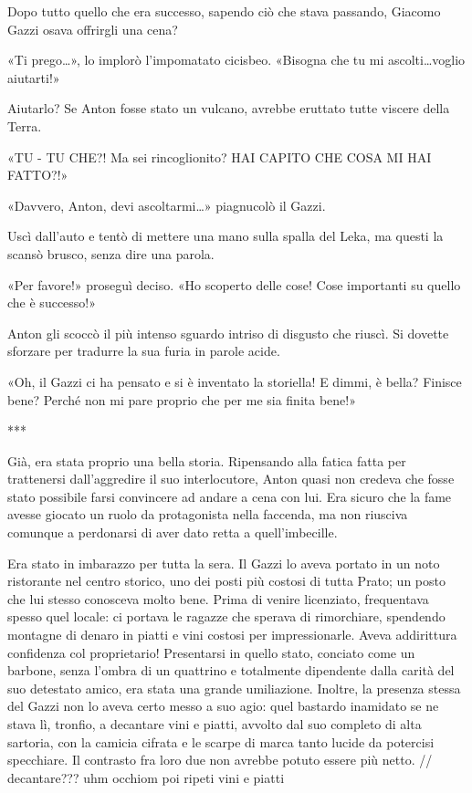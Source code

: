 Dopo tutto quello che era successo, sapendo ciò che stava passando, Giacomo Gazzi osava offrirgli una cena?

«Ti prego\ldots», lo implorò l'impomatato cicisbeo. «Bisogna che tu mi ascolti\ldots voglio aiutarti!»

Aiutarlo? Se Anton fosse stato un vulcano, avrebbe eruttato tutte viscere della Terra.

«TU - TU CHE?! Ma sei rincoglionito? HAI CAPITO CHE COSA MI HAI FATTO?!»

«Davvero, Anton, devi ascoltarmi\ldots» piagnucolò il Gazzi.

Uscì dall'auto e tentò di mettere una mano sulla spalla del Leka, ma questi la scansò brusco, senza dire una parola.

«Per favore!» proseguì deciso. «Ho scoperto delle cose! Cose importanti su quello che è successo!»

Anton gli scoccò il più intenso sguardo intriso di disgusto che riuscì. Si dovette sforzare per tradurre la sua furia in parole acide.

«Oh, il Gazzi ci ha pensato e si è inventato la storiella! E dimmi, è bella? Finisce bene? Perché non mi pare proprio che per me sia finita bene!»

***

Già, era stata proprio una bella storia. Ripensando alla fatica fatta per trattenersi dall'aggredire il suo interlocutore, Anton quasi non credeva che fosse stato possibile farsi convincere ad andare a cena con lui. Era sicuro che la fame avesse giocato un ruolo da protagonista nella faccenda, ma non riusciva comunque a perdonarsi di aver dato retta a quell'imbecille.

Era stato in imbarazzo per tutta la sera. Il Gazzi lo aveva portato in un noto ristorante nel centro storico, uno dei posti più costosi di tutta Prato; un posto che lui stesso conosceva molto bene. Prima di venire licenziato, frequentava spesso quel locale: ci portava le ragazze che sperava di rimorchiare, spendendo montagne di denaro in piatti e vini costosi per impressionarle. Aveva addirittura confidenza col proprietario! Presentarsi in quello stato, conciato come un barbone, senza l'ombra di un quattrino e totalmente dipendente dalla carità del suo detestato amico, era stata una grande umiliazione. Inoltre, la presenza stessa del Gazzi non lo aveva certo messo a suo agio: quel bastardo inamidato se ne stava lì, tronfio, a decantare vini e piatti, avvolto dal suo completo di alta sartoria, con la camicia cifrata e le scarpe di marca tanto lucide da potercisi specchiare. Il contrasto fra loro due non avrebbe potuto essere più netto. // decantare??? uhm occhiom poi ripeti vini e piatti

